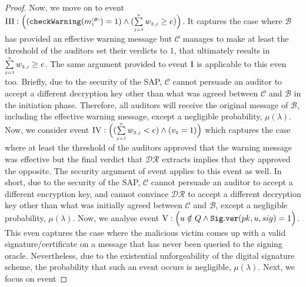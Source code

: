 \begin{proof}
 
 Now, we move on to event   $\text{\MakeUppercase{\romannumeral 3}}: \Big((\mathtt{checkWarning}(m^{\st\mathcal{(B)}}_{\st1})= 1) \wedge (\sum\limits_{\st j=1}^{\st n}w_{\st 2,j}\geq {e})\Big)$. It captures the case where $\mathcal{B}$ has provided an effective warning message but $\mathcal{C}$ manages to make at least the threshold of the auditors  set their verdicts to $1$, that ultimately results in $\sum\limits_{\scriptscriptstyle j=1}^{\scriptscriptstyle n}w_{\scriptscriptstyle 2,j}\geq e$. The same argument provided to event $\text{\MakeUppercase{\romannumeral 1}}$ is applicable to this even too. Briefly, due to the security of the SAP, $\mathcal{C}$ cannot persuade an auditor to accept a different decryption key other than what was agreed between $\mathcal{C}$ and $\mathcal{B}$ in the initiation phase. Therefore, all auditors will receive the original message of $\mathcal{B}$, including the effective warning message, except a negligible probability, $\mu(\lambda)$. Now, we consider  event $\text{\MakeUppercase{\romannumeral 4}}:  \Big((\sum\limits_{\st j=1}^{\st n}w_{\st 2,j}< {e}) \wedge ({v}_{\st 2}=1)\Big)$ which captures the case where at least the threshold of the auditors  approved that the warning message was effective but   the final verdict that $\mathcal{DR}$ extracts implies that they approved the opposite. The security argument of  event  applies to this event as well. In short, due to the security of the SAP, $\mathcal{C}$ cannot persuade  an auditor to accept a different encryption key, and cannot convince $\mathcal{DR}$ to accept a different decryption key other than what was initially agreed between $\mathcal{C}$ and $\mathcal{B}$, except a negligible probability, $\mu(\lambda)$. 
  Now, we analyse event  $\text{\MakeUppercase{\romannumeral 5}}: \Big(u\notin Q \wedge\mathtt{Sig.ver}( pk, u, sig) =1\Big)$. This even captures the case where the malicious victim comes up with a valid signature/certificate on a message that has never been queried to the signing oracle.  Nevertheless, due to the existential unforgeability of the digital signature scheme, the probability that such an event occurs is negligible, $\mu(\lambda)$. Next, we focus on event

\end{proof}
